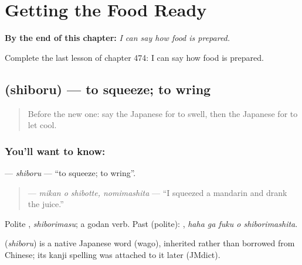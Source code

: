 
\chapter{Getting the Food Ready}
\label{ch:ja-getting-the-food-ready}

\begin{chapteropening}
\textbf{By the end of this chapter:} \emph{I can say how food is prepared.}

Complete the last lesson of chapter 474: I can say how food is prepared.
\end{chapteropening}

\section[\texorpdfstring{\ja{しぼる} (shiboru)}{しぼる (shiboru)}]{ (shiboru) — to squeeze; to wring}

\label{lesson:JA-C474-shiboru}



\begin{quote}
Before the new one: say the Japanese for to swell, then the Japanese for to let cool.
\end{quote}

\subsection*{You'll want to know: }
\textbf{} — \emph{shiboru} — \textquotedblleft{}to squeeze; to wring\textquotedblright{}.

\begin{quote}
\textbf{ } — \emph{mikan o shibotte, nomimashita} — \textquotedblleft{}I squeezed a mandarin and drank the juice.\textquotedblright{}
\end{quote}

Polite \textbf{}, \emph{shiborimasu}; a godan verb. Past (polite): \textbf{  }, \emph{haha ga fuku o shiborimashita}.

\begin{cousinweb}
\textbf{} (\emph{shiboru}) is a native Japanese word (wago), inherited rather than borrowed from Chinese; its kanji spelling was attached to it later (JMdict).
\end{cousinweb}

